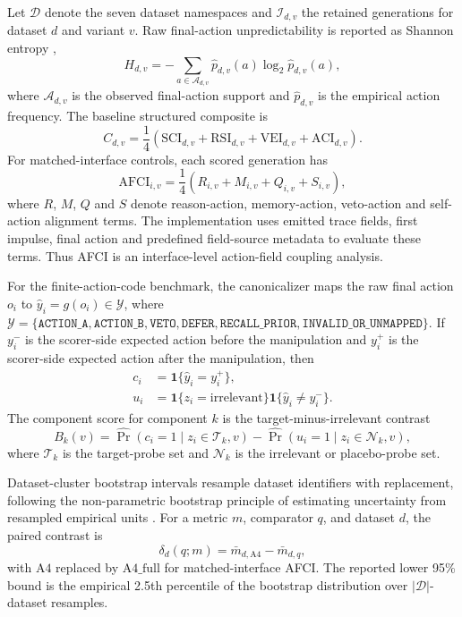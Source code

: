\documentclass[11pt]{article}
\begin{document}
Let \(\mathcal{D}\) denote the seven dataset namespaces and \(\mathcal{I}_{d,v}\) the retained generations for dataset \(d\) and variant \(v\). Raw final-action unpredictability is reported as Shannon entropy \citep{shannon1948mathematical},
\begin{equation}
H_{d,v}=-\sum_{a\in\mathcal{A}_{d,v}}\hat{p}_{d,v}(a)\log_2\hat{p}_{d,v}(a),
\end{equation}
where \(\mathcal{A}_{d,v}\) is the observed final-action support and \(\hat{p}_{d,v}\) is the empirical action frequency. The baseline structured composite is
\begin{equation}
C_{d,v}=\frac{1}{4}\left(\mathrm{SCI}_{d,v}+\mathrm{RSI}_{d,v}+\mathrm{VEI}_{d,v}+\mathrm{ACI}_{d,v}\right).
\end{equation}
For matched-interface controls, each scored generation has
\begin{equation}
\mathrm{AFCI}_{i,v}=\frac{1}{4}\left(R_{i,v}+M_{i,v}+Q_{i,v}+S_{i,v}\right),
\end{equation}
where \(R\), \(M\), \(Q\) and \(S\) denote reason-action, memory-action, veto-action and self-action alignment terms. The implementation uses emitted trace fields, first impulse, final action and predefined field-source metadata to evaluate these terms. Thus AFCI is an interface-level action-field coupling analysis.

For the finite-action-code benchmark, the canonicalizer maps the raw final action \(o_i\) to \(\hat{y}_i=g(o_i)\in\mathcal{Y}\), where \(\mathcal{Y}=\{\texttt{ACTION\_A},\texttt{ACTION\_B},\texttt{VETO},\texttt{DEFER},\texttt{RECALL\_PRIOR},\texttt{INVALID\_OR\_UNMAPPED}\}\). If \(y_i^-\) is the scorer-side expected action before the manipulation and \(y_i^+\) is the scorer-side expected action after the manipulation, then
\begin{align}
c_i &= \mathbf{1}\{\hat{y}_i=y_i^+\},\\
u_i &= \mathbf{1}\{z_i=\mathrm{irrelevant}\}\mathbf{1}\{\hat{y}_i\neq y_i^-\}.
\end{align}
The component score for component \(k\) is the target-minus-irrelevant contrast
\begin{equation}
B_k(v)=\widehat{\Pr}(c_i=1\mid z_i\in\mathcal{T}_k,v)-\widehat{\Pr}(u_i=1\mid z_i\in\mathcal{N}_k,v),
\end{equation}
where \(\mathcal{T}_k\) is the target-probe set and \(\mathcal{N}_k\) is the irrelevant or placebo-probe set.

Dataset-cluster bootstrap intervals resample dataset identifiers with replacement, following the non-parametric bootstrap principle of estimating uncertainty from resampled empirical units \citep{efron1993bootstrap}. For a metric \(m\), comparator \(q\), and dataset \(d\), the paired contrast is
\begin{equation}
\delta_d(q;m)=\bar{m}_{d,\mathrm{A4}}-\bar{m}_{d,q},
\end{equation}
with \(\mathrm{A4}\) replaced by \(\mathrm{A4\_full}\) for matched-interface AFCI. The reported lower 95\% bound is the empirical 2.5th percentile of the bootstrap distribution over \(|\mathcal{D}|\)-dataset resamples.
\end{document}
